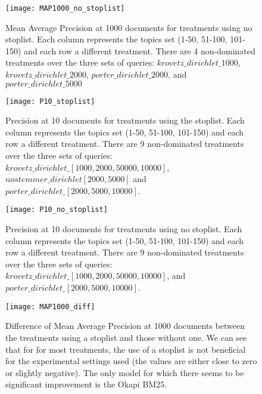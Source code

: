 \documentclass{article} %
\begin{document}
\begin{figure}[!htb]
\begin{center}
 \texttt{[image: MAP1000\_no\_stoplist]}
 \caption{\small  Mean Average Precision at 1000 documents for treatments using no stoplist. Each column represents the topics set (1-50, 51-100, 101-150) and each row a different treatment. There are 4 non-dominated treatments over the three sets of queries:
 $krovetz\_dirichlet\_1000$, $krovetz\_dirichlet\_2000$, $porter\_dirichlet\_2000$, and $porter\_dirichlet\_5000$}
  \label{mapnostoplist}
 \end{center}
\end{figure}






\begin{figure}[!htb]
\begin{center}
 \texttt{[image: P10\_stoplist]}
 \caption{\small  Precision at 10 documents for treatments using the stoplist. Each column represents the topics set (1-50, 51-100, 101-150) and each row a different treatment. There are 9 non-dominated treatments over the three sets of queries: $krovetz\_dirichlet\_[1000, 2000, 50000, 10000]$,
 $no stemmer\_dirichlet[2000, 5000]$ and $porter\_dirichlet\_[2000, 5000, 10000]$.}
  \label{p10stoplist}
 \end{center}
\end{figure}


\begin{figure}[!htb]
\begin{center}
 \texttt{[image: P10\_no\_stoplist]}
 \caption{\small  Precision at 10 documents for treatments using no stoplist. Each column represents the topics set (1-50, 51-100, 101-150) and each row a different treatment. There are 9 non-dominated treatments over the three sets of queries: $krovetz\_dirichlet\_[1000, 2000, 50000, 10000]$, and $porter\_dirichlet\_[2000, 5000, 10000]$.}
  \label{p10nostoplist}
 \end{center}
\end{figure}




\begin{figure}[!htb]
\begin{center}
 \texttt{[image: MAP1000\_diff]}
 \caption{\small Difference of Mean Average Precision at 1000 documents between the treatments using a stoplist and those without one. We can see that for for most treatments, the use of a stoplist is not beneficial for the experimental settings used (the values are either close to zero or slightly negative). The only model for which there seems to be significant improvement is the Okapi BM25.}
 \label{diff:mapdiff}
 \end{center}
\end{figure}
\end{document}
